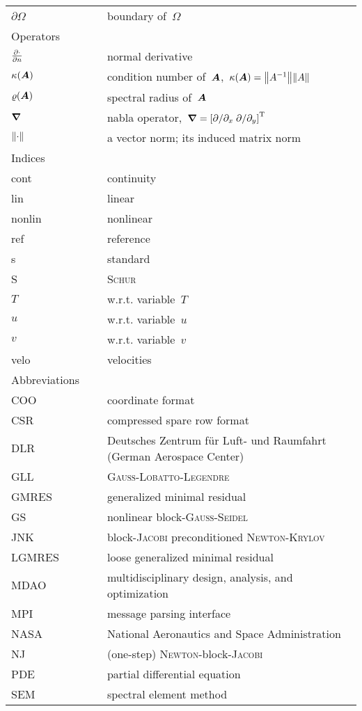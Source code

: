 \begin{longtable}{@{}p{} p{} p{}}
$\partial\Omega$ & ~ & boundary of~$\Omega$\\[10pt]
\mbox{Operators}\\\hline
$\pdiff{\cdot}{n}$ & ~ & normal derivative\\
$\kappa(\boldsymbol{A})$ & ~ & condition number of~$\boldsymbol{A}$,~$\kappa(\mat A) = \norm{A^{-1}}\norm{A}$ \\
$\varrho(\boldsymbol{A})$ & ~ & spectral radius of~$\boldsymbol{A}$ \\
$\boldsymbol{\nabla}$ & ~ & nabla operator,~$\del = \left[ \partial/\partial_x\; \partial/\partial_y \right]^\T$\\
$\norm{\cdot\vphantom{1}}$ & ~ & a vector norm; its induced matrix norm\\[10pt]
\mbox{Indices}\\\hline
cont & ~ & continuity\\
lin & ~ & linear\\
nonlin & ~ & nonlinear\\
ref & ~ & reference\\
s & ~ & standard\\
S & ~ & \textsc{Schur}\\
$T$ & ~ & w.r.t. variable~$T$\\
$u$ & ~ & w.r.t. variable~$u$\\
$v$ & ~ & w.r.t. variable~$v$\\
velo & ~ & velocities\\[10pt]
\mbox{Abbreviations}\\\hline
COO & ~ & coordinate format\\
CSR & ~ & compressed spare row format\\
DLR & ~ & Deutsches Zentrum f\"{u}r Luft- und Raumfahrt (German Aerospace Center)\\
GLL & ~ & \textsc{Gau\ss}-\textsc{Lobatto}-\textsc{Legendre}\\
GMRES & ~ & generalized minimal residual\\
GS & ~ & nonlinear block-\textsc{Gau\ss}-\textsc{Seidel}\\
JNK & ~ & block-\textsc{Jacobi} preconditioned \textsc{Newton}-\textsc{Krylov}\\
LGMRES & ~ & loose generalized minimal residual\\
MDAO & ~ & multidisciplinary design, analysis, and optimization\\
MPI & ~ & message parsing interface\\
NASA & ~ & National Aeronautics and Space Administration\\
NJ & ~ & (one-step) \textsc{Newton}-block-\textsc{Jacobi}\\
PDE & ~ & partial differential equation\\
SEM & ~ & spectral element method
\end{longtable}